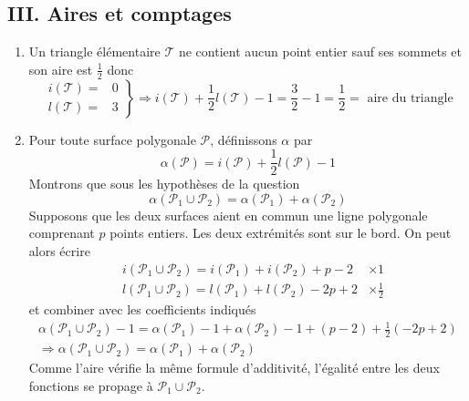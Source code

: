 \subsection*{III. Aires et comptages}
\begin{enumerate}
 \item Un triangle élémentaire $\mathcal T$ ne contient aucun point entier sauf ses sommets et son aire est $\frac{1}{2}$ donc
\begin{displaymath}
\left. 
\begin{aligned}
i(\mathcal T)=& 0 \\ l(\mathcal T) =& 3 
\end{aligned}
\right\rbrace 
\Rightarrow
i(\mathcal T)+\frac{1}{2}l(\mathcal T)-1=\frac{3}{2}-1=\frac{1}{2} = \text{ aire du triangle}
\end{displaymath}

 \item Pour toute surface polygonale $\mathcal P$, définissons $\alpha$ par 
\begin{displaymath}
\alpha(\mathcal P)=i(\mathcal P)+\frac{1}{2}l(\mathcal P)-1  
\end{displaymath}
Montrons que sous les hypothèses de la question
\begin{displaymath}
 \alpha(\mathcal P_1 \cup \mathcal P_2)=\alpha(\mathcal P_1 )+\alpha(\mathcal P_2)
\end{displaymath}
Supposons que les deux surfaces aient en commun une ligne polygonale comprenant $p$ points entiers. Les deux extrémités sont sur le bord. On peut alors écrire
\begin{align*}
 &i(\mathcal P_1 \cup \mathcal P_2)=i(\mathcal P_1)+i(\mathcal P_2)+p-2 &\times 1\\
 &l(\mathcal P_1 \cup \mathcal P_2)=l(\mathcal P_1)+l(\mathcal P_2)-2p +2 &\times \frac{1}{2}
\end{align*}
et combiner avec les coefficients indiqués
\begin{multline*}
  \alpha(\mathcal P_1 \cup \mathcal P_2)-1=\alpha(\mathcal P_1)-1+\alpha(\mathcal P_2)-1+(p-2)+\frac{1}{2}(-2p+2) \\
\Rightarrow
 \alpha(\mathcal P_1 \cup \mathcal P_2)=\alpha(\mathcal P_1)+\alpha(\mathcal P_2)
\end{multline*}
Comme l'aire vérifie la même formule d'additivité, l'égalité entre les deux fonctions se propage à $\mathcal P_1 \cup \mathcal P_2$.


\end{enumerate}
